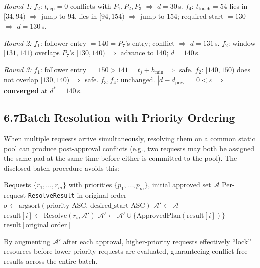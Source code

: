 \documentclass[12pt,a4paper]{article}
\newcommand{\hmin}{h_{\min}}
\newcommand{\tdep}{t_{\mathrm{dep}}}
\newcommand{\ttouch}{t_{\mathrm{touch}}}
\begin{document}
\noindent\textit{Round 1:}
$f_2$: $\tdep = 0$ conflicts with $P_1,P_2,P_3$ $\Rightarrow$
$d = 30$\,s.
$f_4$: $\ttouch = 54$ lies in $[34,94)$ $\Rightarrow$ jump to 94, lies in
$[94,154)$ $\Rightarrow$ jump to 154; required start $= 130$ $\Rightarrow$
$d = 130$\,s.

\noindent\textit{Round 2:}
$f_1$: follower entry $= 140 = P_7$'s entry; conflict $\Rightarrow$
$d = 131$\,s.
$f_2$: window $[131,141)$ overlaps $P_7$'s $[130,140)$ $\Rightarrow$
advance to 140; $d = 140$\,s.

\noindent\textit{Round 3:}
$f_1$: follower entry $= 150 > 141 = t_j + \hmin$ $\Rightarrow$ safe.
$f_2$: $[140,150)$ does not overlap $[130,140)$ $\Rightarrow$ safe.
$f_3, f_4$: unchanged.
$|d - d_{\mathrm{prev}}| = 0 < \varepsilon$ $\Rightarrow$ \textbf{converged}
at $d^* = 140$\,s.

\bigskip
\subsection*{6.7\quad Batch Resolution with Priority Ordering}

When multiple requests arrive simultaneously, resolving them on a common
static pool can produce post-approval conflicts (e.g., two requests may both
be assigned the same pad at the same time before either is committed to the
pool).  The disclosed batch procedure avoids this:

\begin{algorithm}[H]
\caption{Priority-Based Batch Resolution}
\label{alg:batch}
\begin{algorithmic}[1]
\Require Requests $\{r_1, \ldots, r_m\}$ with priorities $\{p_1,\ldots,p_m\}$,
  initial approved set $\mathcal{A}$
\Ensure Per-request \texttt{ResolveResult} in original order
\State $\sigma \gets \mathrm{argsort}(\text{priority ASC, desired\_start ASC})$
\State $\mathcal{A}' \gets \mathcal{A}$
  \State $\mathrm{result}[i] \gets \mathrm{Resolve}(r_i, \mathcal{A}')$
    \State $\mathcal{A}' \gets \mathcal{A}' \cup
           \{\mathrm{ApprovedPlan}(\mathrm{result}[i])\}$
  \EndIf
\EndFor
\Return $\mathrm{result}[\text{original order}]$
\end{algorithmic}
\end{algorithm}

\noindent
By augmenting $\mathcal{A}'$ after each approval, higher-priority requests
effectively ``lock'' resources before lower-priority requests are evaluated,
guaranteeing conflict-free results across the entire batch.
\end{document}
